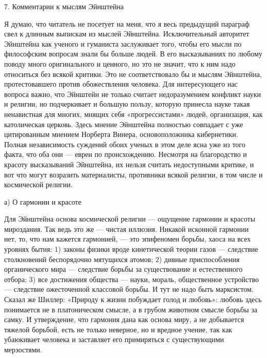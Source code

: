 7. Комментарии к мыслям Эйнштейна

Я  думаю, что  читатель не  посетует на  меня, что  я весь  предыдущий
параграф свел  к длинным выпискам из  мыслей Эйнштейна. Исключительный
авторитет Эйнштейна  как ученого  и гуманиста заслуживает  того, чтобы
его  мысли  по философским  вопросам  знали  бы  больше людей.  В  его
высказываниях  по  любому поводу  много  оригинального  и ценного,  но
это  не  значит,  что  к  ним  надо  относиться  без  всякой  критики.
Это  не   соответствовало  бы  и  мыслям   Эйнштейна,  протестовавшего
против обожествления  человека. Для  интересующего нас  вопроса важно,
что  Эйнштейн  не  только  считает  недоразумением  конфликт  науки  и
религии,  но подчеркивает  и  большую пользу,  которую принесла  науке
такая  ненавистная для  многих,  мнящих  себя «прогрессистами»  людей,
организация,   как  католическая   церковь.  Здесь   мнение  Эйнштейна
полностью  совпадает  с  уже  цитированным  мнением  Норберта  Винера,
основоположника  кибернетики.  Полная   независимость  суждений  обоих
ученых в  этом деле  ясна уже  из того  факта, что  оба они  --- евреи
по  происхождению. Несмотря  на  благородство  и красоту  высказываний
Эйнштейна, их  нельзя считать  недоступными критике,  и вот  что могут
возразить  материалисты,  противники всякой  религии,  в  том числе  и
космической религии.

а) О гармонии и красоте

Для  Эйнштейна  основа космической  религии  ---  ощущение гармонии  и
красоты  мироздания.  Так ведь  это  же  --- чистая  иллюзия.  Никакой
исконной  гармонии  нет,  то,  что  нам  кажется  гармонией,  ---  это
эпифеномен борьбы, хаоса на всех уровнях бытия: 1) законы физики вроде
кинетической  теории  газов  --- следствие  столкновений  беспорядочно
мятущихся  атомов; 2)  дивные  приспособления  органического мира  ---
следствие  борьбы  за существование  и  естественного  отбора; 3)  все
достижения  общества   ---  науки,  мораль,   общественное  устройство
---  следствие  ожесточенной классовой  борьбы.  И  тут не  надо  быть
марксистом.  Сказал же  Шиллер:  «Природу к  жизни  побуждает голод  и
любовь»: любовь здесь понимается не в платоническом смысле, а в грубом
животном смысле борьбы за самку.  И утверждение, что гармония дана как
основа миру, а не добывается тяжелой борьбой, есть не только неверное,
но  и вредное  учение, так  как убаюкивает  человека и  заставляет его
примиряться с существующими мерзостями.

